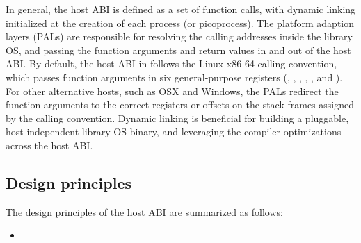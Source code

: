 


In general, the host ABI is defined as a set of function calls, with dynamic linking initialized at the creation of each process (or picoprocess).
The platform adaption layers (PALs)
are responsible for
resolving the calling addresses inside the library OS, and passing the function arguments and return values in and out of the host ABI.
By default, the host ABI in \graphene{} follows the Linux x86-64 calling convention,
which passes function arguments in six general-purpose registers (, , , , , and ).
For other alternative hosts,
such as OSX and Windows, the PALs redirect
the function arguments to the correct registers or offsets on the stack frames assigned by the calling convention.
Dynamic linking is beneficial for
building a pluggable, host-independent library OS binary, and leveraging the compiler optimizations across the host ABI.









\subsection{Design principles}


The design principles of the host ABI are summarized as follows:

\begin{itemize}
	
\item 


\end{itemize}


